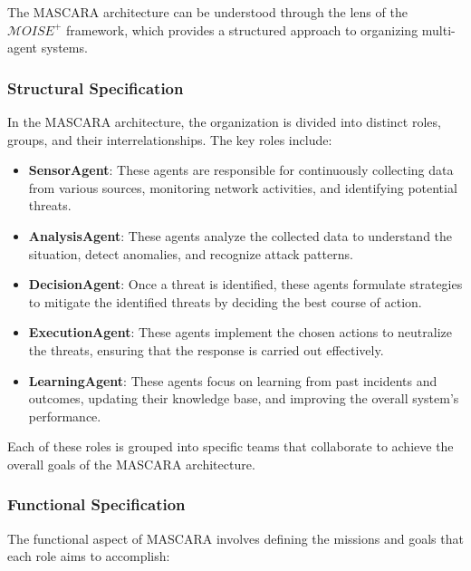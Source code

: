 \documentclass[conference]{IEEEtran}
\newcounter{relation}
\begin{document}
The MASCARA architecture can be understood through the lens of the $\mathcal{M}OISE^+$ framework, which provides a structured approach to organizing multi-agent systems.

\subsubsection*{Structural Specification}

In the MASCARA architecture, the organization is divided into distinct roles, groups, and their interrelationships. The key roles include:

\begin{itemize}
    \item \textbf{SensorAgent}: These agents are responsible for continuously collecting data from various sources, monitoring network activities, and identifying potential threats.
    \item \textbf{AnalysisAgent}: These agents analyze the collected data to understand the situation, detect anomalies, and recognize attack patterns.
    \item \textbf{DecisionAgent}: Once a threat is identified, these agents formulate strategies to mitigate the identified threats by deciding the best course of action.
    \item \textbf{ExecutionAgent}: These agents implement the chosen actions to neutralize the threats, ensuring that the response is carried out effectively.
    \item \textbf{LearningAgent}: These agents focus on learning from past incidents and outcomes, updating their knowledge base, and improving the overall system's performance.
\end{itemize}

Each of these roles is grouped into specific teams that collaborate to achieve the overall goals of the MASCARA architecture.

\subsubsection*{Functional Specification}

The functional aspect of MASCARA involves defining the missions and goals that each role aims to accomplish:
\end{document}
